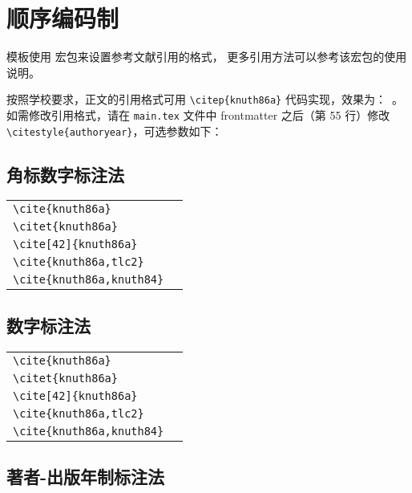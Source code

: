 \section{顺序编码制}

模板使用  宏包来设置参考文献引用的格式，
更多引用方法可以参考该宏包的使用说明。

按照学校要求，正文的引用格式可用 \verb|\citep{knuth86a}| 代码实现，效果为：~\citep{knuth86a}。如需修改引用格式，请在 \texttt{main.tex} 文件中 frontmatter 之后（第 55 行）修改 \verb|\citestyle{authoryear}|，可选参数如下：

\subsection{角标数字标注法}

\noindent
\begin{tabular}{l@{\quad$\Rightarrow$\quad}l}
  \verb|\cite{knuth86a}|         & \cite{knuth86a}         \\
  \verb|\citet{knuth86a}|        & \citet{knuth86a}        \\
  \verb|\cite[42]{knuth86a}|     & \cite[42]{knuth86a}     \\
  \verb|\cite{knuth86a,tlc2}|    & \cite{knuth86a,tlc2}    \\
  \verb|\cite{knuth86a,knuth84}| & \cite{knuth86a,knuth84} \\
\end{tabular}


\subsection{数字标注法}

\noindent
\begin{tabular}{l@{\quad$\Rightarrow$\quad}l}
  \verb|\cite{knuth86a}|         & \cite{knuth86a}         \\
  \verb|\citet{knuth86a}|        & \citet{knuth86a}        \\
  \verb|\cite[42]{knuth86a}|     & \cite[42]{knuth86a}     \\
  \verb|\cite{knuth86a,tlc2}|    & \cite{knuth86a,tlc2}    \\
  \verb|\cite{knuth86a,knuth84}| & \cite{knuth86a,knuth84} \\
\end{tabular}



\subsection{著者-出版年制标注法}\label{sec:author-year}

